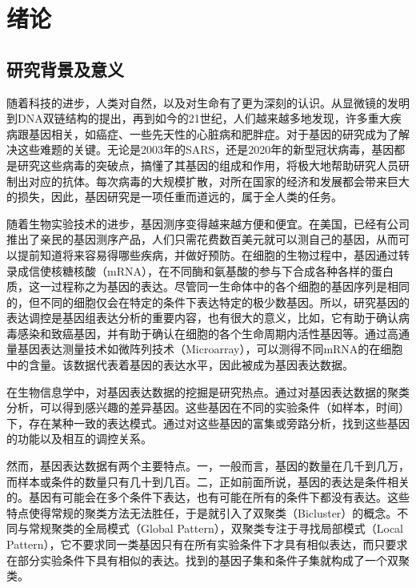 \chapter{绪论}

\section{研究背景及意义}
    随着科技的进步，人类对自然，以及对生命有了更为深刻的认识。从显微镜的发明到DNA双链结构的提出，再到如今的21世纪，人们越来越多地发现，许多重大疾病跟基因相关，如癌症、一些先天性的心脏病和肥胖症。对于基因的研究成为了解决这些难题的关键。无论是2003年的SARS，还是2020年的新型冠状病毒，基因都是研究这些病毒的突破点，搞懂了其基因的组成和作用，将极大地帮助研究人员研制出对应的抗体。每次病毒的大规模扩散，对所在国家的经济和发展都会带来巨大的损失，因此，基因研究是一项任重而道远的，属于全人类的任务。

    随着生物实验技术的进步，基因测序变得越来越方便和便宜。在美国，已经有公司推出了亲民的基因测序产品，人们只需花费数百美元就可以测自己的基因，从而可以提前知道将来容易得哪些疾病，并做好预防。在细胞的生物过程中，基因通过转录成信使核糖核酸（mRNA），在不同酶和氨基酸的参与下合成各种各样的蛋白质，这一过程称之为基因的表达。尽管同一生命体中的各个细胞的基因序列是相同的，但不同的细胞仅会在特定的条件下表达特定的极少数基因。所以，研究基因的表达调控是基因组表达分析的重要内容，也有很大的意义，比如，它有助于确认病毒感染和致癌基因，并有助于确认在细胞的各个生命周期内活性基因等。通过高通量基因表达测量技术如微阵列技术（Microarray），可以测得不同mRNA的在细胞中的含量。该数据代表着基因的表达水平，因此被成为基因表达数据。

    在生物信息学中，对基因表达数据的挖掘是研究热点。通过对基因表达数据的聚类分析，可以得到感兴趣的差异基因。这些基因在不同的实验条件（如样本，时间）下，存在某种一致的表达模式。通过对这些基因的富集或旁路分析，找到这些基因的功能以及相互的调控关系。

    然而，基因表达数据有两个主要特点。一，一般而言，基因的数量在几千到几万，而样本或条件的数量只有几十到几百。二，正如前面所说，基因的表达是条件相关的。基因有可能会在多个条件下表达，也有可能在所有的条件下都没有表达。这些特点使得常规的聚类方法无法胜任，于是就引入了双聚类（Bicluster）的概念。不同与常规聚类的全局模式（Global Pattern），双聚类专注于寻找局部模式（Local Pattern），它不要求同一类基因只有在所有实验条件下才具有相似表达，而只要求在部分实验条件下具有相似的表达。找到的基因子集和条件子集就构成了一个双聚类。

